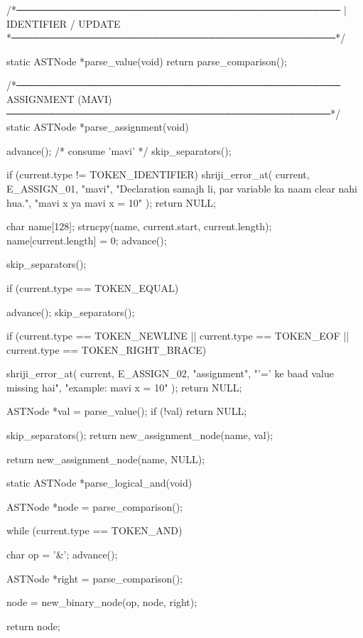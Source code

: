 \documentclass{article}
\begin{document}
/*──────────────────────────────────────────────
 | IDENTIFIER / UPDATE
 *──────────────────────────────────────────────*/

static ASTNode *parse_value(void)
{
    return parse_comparison();
}












/*──────────────────────────────────────────────
  ASSIGNMENT (MAVI)
──────────────────────────────────────────────*/
static ASTNode *parse_assignment(void)
{
    advance(); /* consume 'mavi' */
    skip_separators();

    if (current.type != TOKEN_IDENTIFIER) {
        shriji_error_at(
            current,
            E_ASSIGN_01,
            "mavi",
            "Declaration samajh li, par variable ka naam clear nahi hua.",
            "mavi x  ya  mavi x = 10"
        );
        return NULL;
    }

    char name[128];
    strncpy(name, current.start, current.length);
    name[current.length] = 0;
    advance();

    skip_separators();

    if (current.type == TOKEN_EQUAL) {
        advance();
        skip_separators();

        if (current.type == TOKEN_NEWLINE ||
            current.type == TOKEN_EOF ||
            current.type == TOKEN_RIGHT_BRACE) {

            shriji_error_at(
                current,
                E_ASSIGN_02,
                "assignment",
                "'=' ke baad value missing hai",
                "example: mavi x = 10"
            );
            return NULL;
        }

        ASTNode *val = parse_value();
        if (!val) return NULL;

        skip_separators();
        return new_assignment_node(name, val);
    }

    return new_assignment_node(name, NULL);
}






static ASTNode *parse_logical_and(void)
{
    ASTNode *node = parse_comparison();

    while (current.type == TOKEN_AND)
    {
        char op = '&';
        advance();

        ASTNode *right = parse_comparison();

        node = new_binary_node(op, node, right);
    }

    return node;
}
\end{document}
